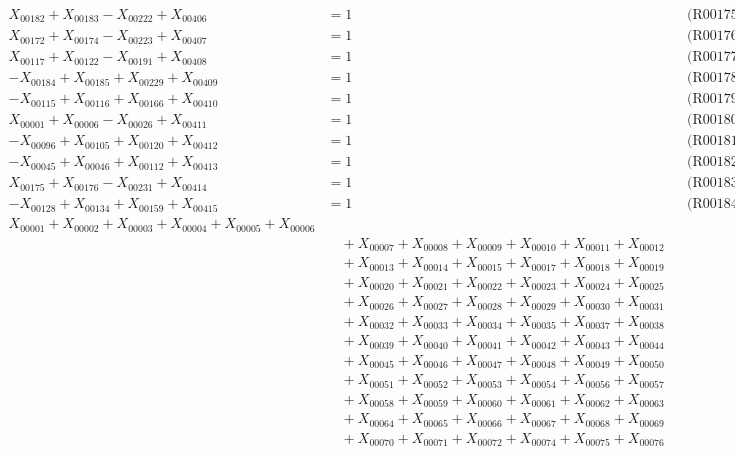 \documentclass[a4paper,10pt]{article}
\begin{document}
{\begin{align}
X_{00182} + X_{00183} - X_{00222} + X_{00406} &= 1 && \text{(R00175)} \\
X_{00172} + X_{00174} - X_{00223} + X_{00407} &= 1 && \text{(R00176)} \\
X_{00117} + X_{00122} - X_{00191} + X_{00408} &= 1 && \text{(R00177)} \\
-X_{00184} + X_{00185} + X_{00229} + X_{00409} &= 1 && \text{(R00178)} \\
-X_{00115} + X_{00116} + X_{00166} + X_{00410} &= 1 && \text{(R00179)} \\
X_{00001} + X_{00006} - X_{00026} + X_{00411} &= 1 && \text{(R00180)} \\
\allowbreak
-X_{00096} + X_{00105} + X_{00120} + X_{00412} &= 1 && \text{(R00181)} \\
-X_{00045} + X_{00046} + X_{00112} + X_{00413} &= 1 && \text{(R00182)} \\
X_{00175} + X_{00176} - X_{00231} + X_{00414} &= 1 && \text{(R00183)} \\
-X_{00128} + X_{00134} + X_{00159} + X_{00415} &= 1 && \text{(R00184)} \\
X_{00001} + X_{00002} + X_{00003} + X_{00004} + X_{00005} + X_{00006} \\[0.5ex]
&\quad  + X_{00007} + X_{00008} + X_{00009} + X_{00010} + X_{00011} + X_{00012} \\[0.5ex]
&\quad  + X_{00013} + X_{00014} + X_{00015} + X_{00017} + X_{00018} + X_{00019} \\[0.5ex]
&\quad  + X_{00020} + X_{00021} + X_{00022} + X_{00023} + X_{00024} + X_{00025} \\[0.5ex]
&\quad  + X_{00026} + X_{00027} + X_{00028} + X_{00029} + X_{00030} + X_{00031} \\[0.5ex]
&\quad  + X_{00032} + X_{00033} + X_{00034} + X_{00035} + X_{00037} + X_{00038} \\[0.5ex]
&\quad  + X_{00039} + X_{00040} + X_{00041} + X_{00042} + X_{00043} + X_{00044} \\[0.5ex]
&\quad  + X_{00045} + X_{00046} + X_{00047} + X_{00048} + X_{00049} + X_{00050} \\[0.5ex]
&\quad  + X_{00051} + X_{00052} + X_{00053} + X_{00054} + X_{00056} + X_{00057} \\[0.5ex]
&\quad  + X_{00058} + X_{00059} + X_{00060} + X_{00061} + X_{00062} + X_{00063} \\[0.5ex]
&\quad  + X_{00064} + X_{00065} + X_{00066} + X_{00067} + X_{00068} + X_{00069} \\[0.5ex]
&\quad  + X_{00070} + X_{00071} + X_{00072} + X_{00074} + X_{00075} + X_{00076} \\[0.5ex]

\end{align}}
\end{document}
